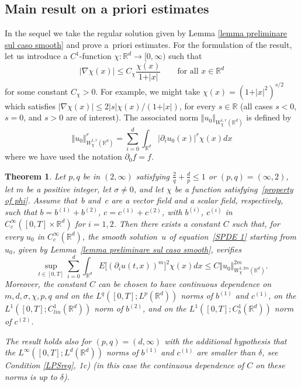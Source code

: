 \documentclass[a4paper,10pt]{article}
\newtheorem{theorem}{Theorem}[section]
\newcommand\1{\mathbbm{1}}
\numberwithin{equation}{section}
\begin{document}
\subsection{Main result on a priori estimates}

In the sequel we take the regular solution given by Lemma \ref{lemma preliminare sul caso smooth} and prove a~priori estimates. For the formulation of the result, let us introduce a $C^{1}$-function $\chi \colon \mathbb{R}^{d}\rightarrow [0,\infty)$ such that
\begin{equation}
\vert \nabla \chi (x) \vert \leq C_{\chi} \frac{\chi(x)}{1+\vert x\vert} \qquad \text{for all } x \in \mathbb{R}^{d}
\label{property of phi}
\end{equation}
for some constant $C_{\chi}>0$. For example, we might take $\chi(x)  =(1+\vert x\vert^{2})^{s/2}$ which satisfies $\vert \nabla\chi(x)\vert \leq 2 \vert s \vert \chi(x)/(1+\vert x \vert)$, for every $s\in\mathbb{R}$ (all cases $s<0$, $s=0$, and $s>0$ are of interest). The associated norm $\Vert u_{0}\Vert_{W_{\chi}^{1,r}(\mathbb{R}^{d})}$ is defined by
\begin{equation*}
\Vert u_{0} \Vert_{W_{\chi}^{1,r} (\mathbb{R}^{d})}^{r} = \sum_{i=0}^{d} \int_{\mathbb{R}^{d}} \vert \partial_{i}u_{0}(x) \vert^{r} \chi(x)  dx
\end{equation*}
where we have used the notation $\partial_{0}f=f$.

\begin{theorem}
\label{theorem a priori estimate} Let $p,q$ be in $(2,\infty)$ satisfying $\frac{2}{q}+\frac{d}{p}\leq1$ or $(p,q)=(\infty,2)$, let $m$ be a positive integer, let $\sigma \neq 0$, and let $\chi$ be a function satisfying~\eqref{property of phi}. Assume that~$b$ and~$c$ are a vector field and a scalar field, respectively, such that $b=b^{(1)}+b^{(2)}$, $c=c^{(1)}+c^{(2)}$, with $b^{(i)}$, $c^{(i)}$ in $C_{c}^{\infty}([0,T]\times \mathbb{R}^{d})$ for $i=1,2$. 
Then there exists a constant $C$ such that, for every $u_{0}$ in $C_{c}^{\infty}(\mathbb{R}^{d})$, the smooth solution~$u$ of equation~\eqref{SPDE 1} starting from $u_{0}$, given by Lemma~\ref{lemma preliminare sul caso smooth}, verifies
\[
\sup_{t\in [0,T]}\sum_{i=0}^{d} \int_{\mathbb{R}^{d}} E\big[ (\partial_{i}u(t,x))^{m} \big]^{2} \chi(x) dx\leq C \Vert u_{0} \Vert_{W_{\chi}^{1,2m}(\mathbb{R}^{d}) }^{2m}.
\]
Moreover, the constant $C$ can be chosen to have continuous dependence on $m,d,\sigma
,\chi,p,q$ and on the $L^{q}([0,T];L^{p}(\mathbb{R}^{d}))$ norms of $b^{(1)}$
and $c^{(1)}$, on the $L^{1}([0,T];C_{lin}^{1}(\mathbb{R}^{d}))$ norm of
$b^{(2)}$, and on the $L^{1}([0,T];C_{b}^{1}(\mathbb{R}^{d}))$ norm of $c^{(2)}$.

The result holds also for $(p,q)=(d,\infty)$ with the additional
hypothesis that the $L^{\infty}([0,T];L^{d}(\mathbb{R}^{d}))$ norms of
$b^{(1)}$ and $c^{(1)}$ are smaller than $\delta$, see Condition
\ref{LPSreg}, \textup{1c)} \textup{(}in this case the continuous dependence of $C$ on these norms
is up to $\delta$\textup{)}.
\end{theorem}
\end{document}
